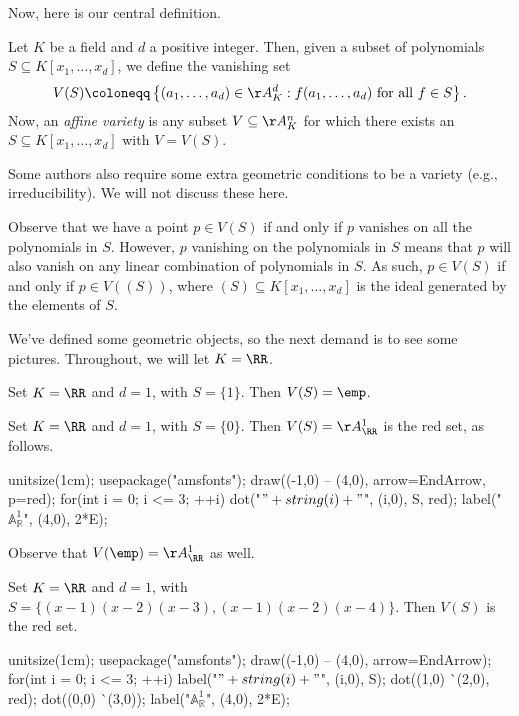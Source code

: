 \documentclass{article}
\begin{document}
Now, here is our central definition.
\begin{definition}
	Let $K$ be a field and $d$ a positive integer. Then, given a subset of polynomials $S\subseteq K[x_1,\ldots,x_d]$, we define the vanishing set
	\[V(S)\coloneqq\left\{(a_1,\ldots,a_d)\in\AA_K^d:f(a_1,\ldots,a_d)\text{ for all }f\in S\right\}.\]
	Now, an \textit{affine variety} is any subset $V\subseteq\AA_K^n$ for which there exists an $S\subseteq K[x_1,\ldots,x_d]$ with $V=V(S)$.
\end{definition}
\begin{remark}
	Some authors also require some extra geometric conditions to be a variety (e.g., irreducibility). We will not discuss these here.
\end{remark}
\begin{remark} \label{rem:useideals}
	Observe that we have a point $p\in V(S)$ if and only if $p$ vanishes on all the polynomials in $S$. However, $p$ vanishing on the polynomials in $S$ means that $p$ will also vanish on any linear combination of polynomials in $S$. As such, $p\in V(S)$ if and only if $p\in V((S))$, where $(S)\subseteq K[x_1,\ldots,x_d]$ is the ideal generated by the elements of $S$.
\end{remark}
We've defined some geometric objects, so the next demand is to see some pictures. Throughout, we will let $K=\RR$.
\begin{example}
	Set $K=\RR$ and $d=1$, with $S=\{1\}$. Then $V(S)=\emp$.
\end{example}
\begin{example}
	Set $K=\RR$ and $d=1$, with $S=\{0\}$. Then $V(S)=\AA_\RR^1$ is the red set, as follows.
	\begin{center}
		\begin{asy}
			unitsize(1cm);
			usepackage("amsfonts");
			draw((-1,0) -- (4,0), arrow=EndArrow, p=red);
			for(int i = 0; i <= 3; ++i)
			{
				dot("$"+string(i)+"$", (i,0), S, red);
			}
			label("$\mathbb A_{\mathbb R}^1$", (4,0), 2*E);
		\end{asy}
	\end{center}
	Observe that $V(\emp)=\AA_\RR^1$ as well.
\end{example}
\begin{example}
	Set $K=\RR$ and $d=1$, with $S=\{(x-1)(x-2)(x-3),(x-1)(x-2)(x-4)\}$. Then $V(S)$ is the red set.
	\begin{center}
		\begin{asy}
			unitsize(1cm);
			usepackage("amsfonts");
			draw((-1,0) -- (4,0), arrow=EndArrow);
			for(int i = 0; i <= 3; ++i)
			{
				label("$"+string(i)+"$", (i,0), S);
			}
			dot((1,0) ^^ (2,0), red);
			dot((0,0) ^^ (3,0));
			label("$\mathbb A_{\mathbb R}^1$", (4,0), 2*E);
		\end{asy}
	\end{center}
\end{example}
\end{document}

